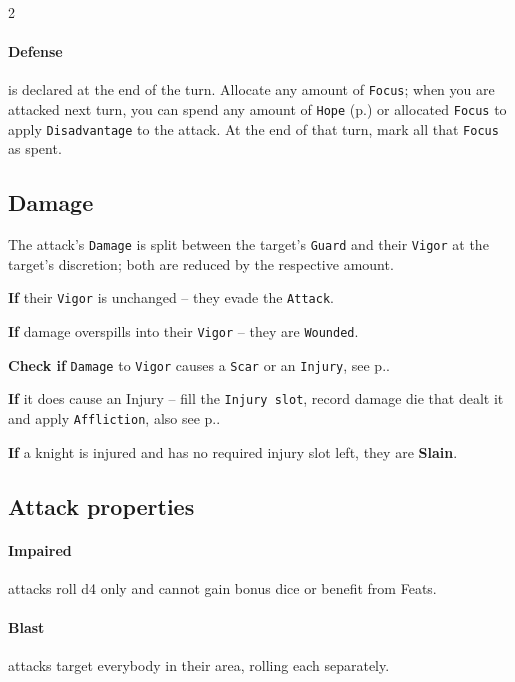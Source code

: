 \begin{multicols*}{2}
\paragraph{Defense} is declared at the end of the turn. 
Allocate any amount of \texttt{Focus}; when you are attacked next turn, you can spend any amount of \texttt{Hope} (p.\pageref*{sec:hopefear}) or allocated \texttt{Focus} to apply \texttt{Disadvantage} to the attack.
At the end of that turn, mark all that \texttt{Focus} as spent. 

\newcolumn 

\subsection*{Damage}
\label{sec:wounded}

The attack’s \texttt{Damage} is split between the
target’s \texttt{Guard} and their \texttt{Vigor} at the target's discretion; both are reduced by the respective amount.

\textbf{If} their \texttt{Vigor} is unchanged -- they evade the \texttt{Attack}.

\textbf{If} damage overspills into their \texttt{Vigor} -- they are \texttt{Wounded}.

\textbf{Check if} \texttt{Damage} to \texttt{Vigor} causes a \texttt{Scar} or an \texttt{Injury}, see p.\pageref*{sec:injuries}.

\textbf{If} it does cause an Injury -- fill the \texttt{Injury slot}, record damage die that dealt it and apply \texttt{Affliction}, also see p.\pageref*{sec:affliction}.

\textbf{If} a knight is injured and has no required injury slot left, they are \textbf{Slain}.

\subsection*{Attack properties}

\paragraph{Impaired} attacks roll d4 only and cannot
gain bonus dice or benefit from Feats.

\paragraph{Blast} attacks target everybody in their area,
rolling each separately.

\end{multicols*}
